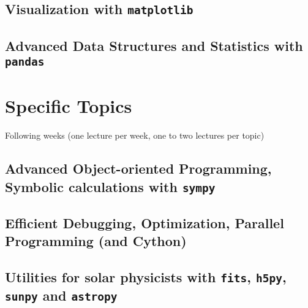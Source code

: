 \documentclass[10pt,a4paper]{article}
\begin{document}
		\subsection{Visualization with \texttt{matplotlib}}
		\subsection{Advanced Data Structures and Statistics with \texttt{pandas}}
	
	\vspace{1cm}
	\section{Specific Topics}
	Following weeks (one lecture per week, one to two lectures per topic)
		
		\subsection{Advanced Object-oriented Programming, Symbolic calculations with \texttt{sympy}}
		\subsection{Efficient Debugging, Optimization, Parallel Programming (and Cython)}
		\subsection{Utilities for solar physicists with \texttt{fits}, \texttt{h5py}, \texttt{sunpy} and \texttt{astropy}}
		
	\thispagestyle{empty}
\end{document}
